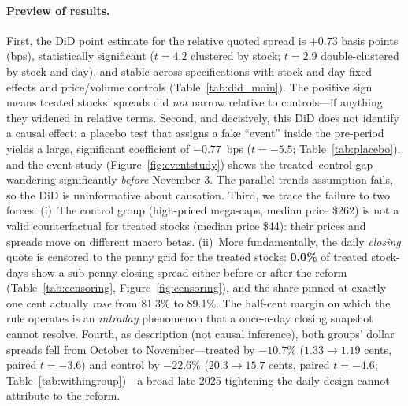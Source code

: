 \documentclass[12pt]{article}
\begin{document}
\paragraph{Preview of results.} First, the DiD point estimate for the relative quoted
spread is $+0.73$ basis points (bps), statistically significant ($t=4.2$ clustered by
stock; $t=2.9$ double-clustered by stock and day), and stable across specifications with
stock and day fixed effects and price/volume controls (Table~\ref{tab:did_main}). The
positive sign means treated stocks' spreads did \emph{not} narrow relative to controls---if
anything they widened in relative terms. Second, and decisively, this DiD does not identify
a causal effect: a placebo test that assigns a fake ``event'' inside the pre-period yields a
large, significant coefficient of $-0.77$~bps ($t=-5.5$; Table~\ref{tab:placebo}), and the
event-study (Figure~\ref{fig:eventstudy}) shows the treated--control gap wandering
significantly \emph{before} November 3. The parallel-trends assumption fails, so the DiD is
uninformative about causation. Third, we trace the failure to two forces. (i)~The control
group (high-priced mega-caps, median price \$262) is not a valid counterfactual for
treated stocks (median price \$44): their prices and spreads move on different macro betas.
(ii)~More fundamentally, the daily \emph{closing} quote is censored to the penny grid for
the treated stocks: \textbf{0.0\%} of treated stock-days show a sub-penny closing spread
either before or after the reform (Table~\ref{tab:censoring}, Figure~\ref{fig:censoring}),
and the share pinned at exactly one cent actually \emph{rose} from 81.3\% to 89.1\%. The
half-cent margin on which the rule operates is an \emph{intraday} phenomenon that a
once-a-day closing snapshot cannot resolve. Fourth, as description (not causal inference),
both groups' dollar spreads fell from October to November---treated by $-10.7\%$
($1.33\to1.19$ cents, paired $t=-3.6$) and control by $-22.6\%$ ($20.3\to15.7$ cents,
paired $t=-4.6$; Table~\ref{tab:withingroup})---a broad late-2025 tightening the daily
design cannot attribute to the reform.
\end{document}

